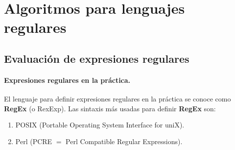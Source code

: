 \section{Algoritmos para lenguajes regulares}

\subsection{Evaluación de expresiones regulares}

\paragraph{Expresiones regulares en la práctica.} El lenguaje para definir expresiones regulares en la práctica se conoce como \textbf{RegEx} (o RexExp). Las sintaxis más usadas para definir \textbf{RegEx} son:
\begin{enumerate}
    \item POSIX (Portable Operating System Interface for uniX).
    \item Perl (PCRE $=$ Perl Compatible Regular Expressions).
\end{enumerate}

